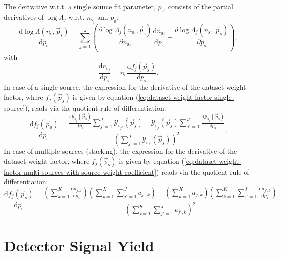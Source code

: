 \documentclass{article}
\newcommand{\ns}{n_{\mathrm{s}}}
\newcommand{\nsj}{n_{\mathrm{s}_j}}
\newcommand{\ps}{\vec{p}_{\mathrm{s}}}
\begin{document}
The derivative w.r.t. a single source fit parameter, $p_{\mathrm{s}}$, consists
of the partial derivatives of $\log \Lambda_j$ w.r.t. $n_{\mathrm{s}_j}$ and
$p_{\mathrm{s}}$:
\begin{equation}
 \frac{\mathrm{d} \log \Lambda(\ns,\ps)}{\mathrm{d} p_{\mathrm{s}}} = \sum_{j=1}^{J} \left( \frac{\partial \log \Lambda_j(\nsj,\ps)}{\partial \nsj} \frac{\mathrm{d} \nsj}{\mathrm{d} p_{\mathrm{s}}} + \frac{\partial \log \Lambda_j(\nsj,\ps)}{\partial p_{\mathrm{s}}} \right),
\end{equation}
with
\begin{equation}
 \frac{\mathrm{d} \nsj}{\mathrm{d} p_{\mathrm{s}}} = \ns \frac{\mathrm{d} f_j(\ps)}{\mathrm{d} p_{\mathrm{s}}}.
\end{equation}
In case of a single source, the expression for the derivative of the dataset
weight factor, where $f_j(\ps)$ is given by equation (\ref{eq:dataset-weight-factor-single-source}),
reads via the quotient rule of differentiation:
\begin{equation}
\frac{\mathrm{d}f_j(\ps)}{\mathrm{d}p_{\mathrm{s}}} = \frac{\frac{\mathrm{d}\mathcal{Y}_{\mathrm{s}_j}(\ps)}{\mathrm{d}p_{\mathrm{s}}} \sum_{j'=1}^{J}\mathcal{Y}_{\mathrm{s}_{j'}}(\ps) - \mathcal{Y}_{\mathrm{s}_j}(\ps) \sum_{j'=1}^{J} \frac{\mathrm{d}\mathcal{Y}_{\mathrm{s}_{j'}}(\ps)}{\mathrm{d}p_{\mathrm{s}}} }{\left( \sum_{j'=1}^{J} \mathcal{Y}_{\mathrm{s}_{j'}}(\ps) \right)^2}.
\end{equation}
In case of multiple sources (stacking), the expression for the derivative of the
dataset weight factor, where $f_j(\ps)$ is given by equation
(\ref{eq:dataset-weight-factor-multi-sources-with-source-weight-coefficient})
reads via the quotient rule of differentiation:
\begin{equation}
 \frac{\mathrm{d} f_j(\ps)}{\mathrm{d}p_{\mathrm{s}}} =
    \frac{\left(\sum_{k=1}^{K} \frac{\mathrm{d}a_{j,k}}{\mathrm{d}p_{\mathrm{s}}}\right) \left(\sum_{k=1}^{K}\sum_{j'=1}^{J}a_{j',k}\right) - \left(\sum_{k=1}^{K} a_{j,k}\right)\left(\sum_{k=1}^{K}\sum_{j'=1}^{J}\frac{\mathrm{d}a_{j',k}}{\mathrm{d}p_{\mathrm{s}}}\right)}
         {\left(\sum_{k=1}^{K}\sum_{j'=1}^{J}a_{j',k} \right)^2}
\end{equation}

\section{Detector Signal Yield}
\label{sec:detsigyield}
\end{document}
